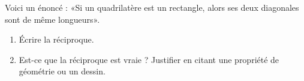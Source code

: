
\begin{exercice}\label{exosmath-0902}

    Voici un énoncé : «Si un quadrilatère est un rectangle, alors ses deux diagonales sont de même longueurs».
    \begin{enumerate}
        \item
            Écrire la réciproque.
        \item
            Est-ce que la réciproque est vraie ? Justifier en citant une propriété de géométrie ou un dessin.
    \end{enumerate}

\end{exercice}
